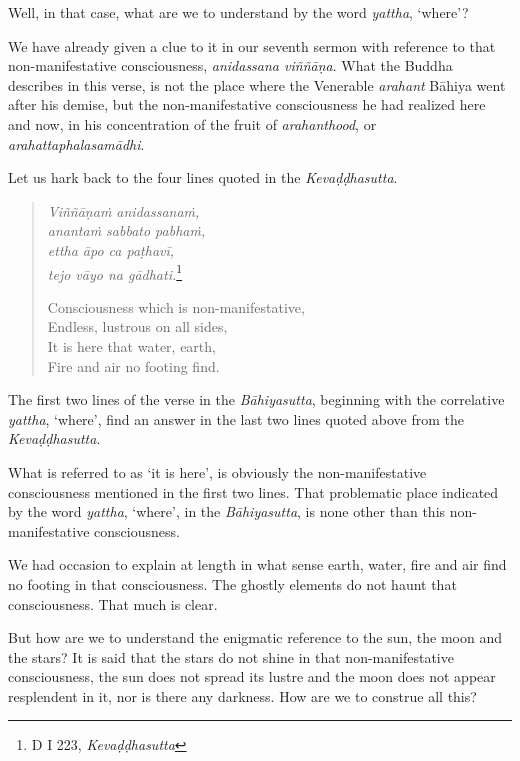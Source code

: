 Well, in that case, what are we to understand by the word \emph{yattha}, `where'?

We have already given a clue to it in our seventh sermon with reference to that non-manifestative consciousness, \emph{anidassana viññāṇa}. What the Buddha describes in this verse, is not the place where the Venerable \emph{arahant} Bāhiya went after his demise, but the non-manifestative consciousness he had realized here and now, in his concentration of the fruit of \emph{arahanthood}, or \emph{arahattaphalasamādhi}.

Let us hark back to the four lines quoted in the \emph{Kevaḍḍhasutta}.

\clearpage

\begin{quote}
\emph{Viññāṇaṁ anidassanaṁ,}\\
\emph{anantaṁ sabbato pabhaṁ,}\\
\emph{ettha āpo ca paṭhavī,}\\
\emph{tejo vāyo na gādhati.}\footnote{D I 223, \emph{Kevaḍḍhasutta}}

Consciousness which is non-manifestative,\\
Endless, lustrous on all sides,\\
It is here that water, earth,\\
Fire and air no footing find.
\end{quote}

The first two lines of the verse in the \emph{Bāhiyasutta}, beginning with the correlative \emph{yattha}, `where', find an answer in the last two lines quoted above from the \emph{Kevaḍḍhasutta}.

What is referred to as `it is here', is obviously the non-manifestative consciousness mentioned in the first two lines. That problematic place indicated by the word \emph{yattha}, `where', in the \emph{Bāhiyasutta}, is none other than this non-manifestative consciousness.

We had occasion to explain at length in what sense earth, water, fire and air find no footing in that consciousness. The ghostly elements do not haunt that consciousness. That much is clear.

But how are we to understand the enigmatic reference to the sun, the moon and the stars? It is said that the stars do not shine in that non-manifestative consciousness, the sun does not spread its lustre and the moon does not appear resplendent in it, nor is there any darkness. How are we to construe all this?

